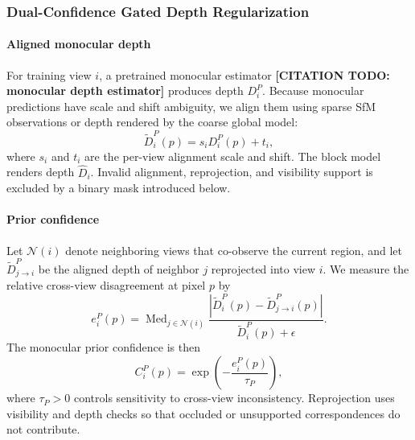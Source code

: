 \documentclass[conference]{IEEEtran}
\begin{document}
\subsubsection{Dual-Confidence Gated Depth Regularization}

\paragraph{Aligned monocular depth}
For training view $i$, a pretrained monocular estimator \textbf{[CITATION TODO: monocular depth estimator]} produces depth $D_i^P$. Because monocular predictions have scale and shift ambiguity, we align them using sparse SfM observations or depth rendered by the coarse global model:
\begin{equation}
\widetilde D_i^P(p)=s_iD_i^P(p)+t_i,
\label{eq:depthalign}
\end{equation}
where $s_i$ and $t_i$ are the per-view alignment scale and shift. The block model renders depth $\hat D_i$. Invalid alignment, reprojection, and visibility support is excluded by a binary mask introduced below.

\paragraph{Prior confidence}
Let $\mathcal{N}(i)$ denote neighboring views that co-observe the current region, and let $\widetilde D_{j\rightarrow i}^P$ be the aligned depth of neighbor $j$ reprojected into view $i$. We measure the relative cross-view disagreement at pixel $p$ by
\begin{equation}
e_i^P(p)=\operatorname{Med}_{j\in\mathcal{N}(i)}
\frac{\left|\widetilde D_i^P(p)-\widetilde D_{j\rightarrow i}^P(p)\right|}
{\widetilde D_i^P(p)+\epsilon}.
\label{eq:priorerror}
\end{equation}
The monocular prior confidence is then
\begin{equation}
C_i^P(p)=\exp\left(-\frac{e_i^P(p)}{\tau_P}\right),
\label{eq:priorconfidence}
\end{equation}
where $\tau_P>0$ controls sensitivity to cross-view inconsistency. Reprojection uses visibility and depth checks so that occluded or unsupported correspondences do not contribute.
\end{document}
